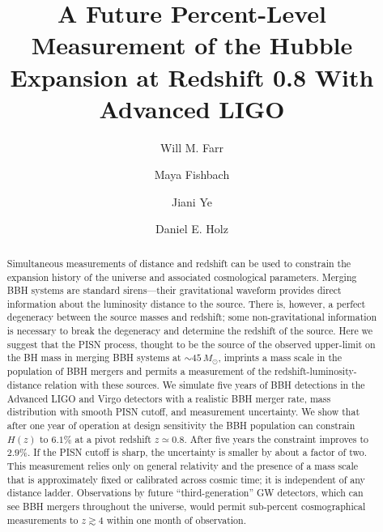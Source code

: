 \documentclass[modern]{aastex62}
\newcommand{\MPISN}{45 \, \MSun{}}
\newcommand{\SigmaHPvtOneYear}{6.1 \%}
\newcommand{\SigmaHPvtFiveYear}{2.9 \%}
\newcommand{\zpivot}{0.8}
\newcommand{\MSun}{M_\odot}
\begin{document}
\title{A Future Percent-Level Measurement of the Hubble Expansion at Redshift
0.8 With Advanced LIGO}

\author[0000-0003-1540-8562]{Will M. Farr}

\author[0000-0002-1980-5293]{Maya Fishbach}

\author{Jiani Ye}

\author[0000-0002-0175-5064]{Daniel E. Holz}

\begin{abstract}
%
  Simultaneous measurements of distance and redshift can be used to constrain
  the expansion history of the universe and associated cosmological parameters.
  Merging \ac{BBH} systems are standard sirens---their gravitational waveform
  provides direct information about the luminosity distance to the source. There
  is, however, a perfect degeneracy between the source masses and redshift; some
  non-gravitational information is necessary to break the degeneracy and
  determine the redshift of the source.  Here we suggest that the \ac{PISN}
  process, thought to be the source of the observed upper-limit on the \ac{BH}
  mass in merging \ac{BBH} systems at $\sim \MPISN{}$, imprints a mass scale in
  the population of \ac{BBH} mergers and permits a measurement of the
  redshift-luminosity-distance relation with these sources.  We simulate five
  years of \ac{BBH} detections in the Advanced LIGO and Virgo detectors with a
  realistic \ac{BBH} merger rate, mass distribution with smooth \ac{PISN}
  cutoff, and measurement uncertainty. We show that after one year of operation
  at design sensitivity the \ac{BBH} population can constrain $H(z)$ to
  $\SigmaHPvtOneYear$ at a pivot redshift $z \simeq \zpivot$.  After five years
  the constraint improves to $\SigmaHPvtFiveYear$. If the \ac{PISN} cutoff is
  sharp, the uncertainty is smaller by about a factor of two.  This measurement
  relies only on general relativity and the presence of a mass scale that is
  approximately fixed or calibrated across cosmic time; it is independent of any
  distance ladder. Observations by future ``third-generation'' \ac{GW}
  detectors, which can see \ac{BBH} mergers throughout the universe, would
  permit sub-percent cosmographical measurements to $z \gtrsim 4$ within one
  month of observation.
%
\end{abstract}
\end{document}
